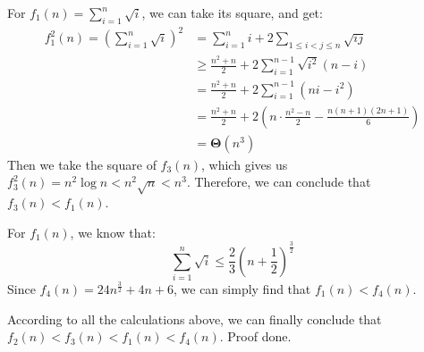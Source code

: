 \documentclass[12pt, a4paper]{article}
\begin{document}
\begin{enumerate}
          For $f_1(n) = \sum_{i=1}^n \sqrt{i}$, we can take its square, and get:
          \begin{align*}
              f_1^2(n) = (\sum_{i=1}^n \sqrt{i})^2 &= \sum_{i=1}^n i + 2\sum_{1 \leq i < j \leq n}\sqrt{ij}\\
                                                   &\geq \frac{n^2 + n}{2} + 2\sum_{i=1}^{n-1} \sqrt{i^2}(n-i)\\
                                                   &= \frac{n^2 + n}{2} + 2\sum_{i=1}^{n-1} (ni - i^2)\\
                                                   &= \frac{n^2 + n}{2} + 2(n\cdot \frac{n^2 - n}{2} - \frac{n(n+1)(2n+1)}{6})\\
                                                   &= \boldsymbol{\Theta}(n^3)
          \end{align*}
          Then we take the square of $f_3(n)$, which gives us $f_3^2(n) = n^2\log n < n^2\sqrt{n} < n^3$. 
          Therefore, we can conclude that $f_3(n) < f_1(n)$.

          For $f_1(n)$, we know that:
          $$\sum_{i=1}^n \sqrt{i} \leq \frac{2}{3}(n + \frac{1}{2})^{\frac{3}{2}}$$
          Since $f_4(n) = 24n^{\frac{3}{2}} + 4n + 6$, we can simply find that $f_1(n) < f_4(n)$. 

          According to all the calculations above, we can finally conclude that $f_2(n) < f_3(n) < f_1(n) < f_4(n)$. Proof done.

\end{enumerate}
\end{document}

